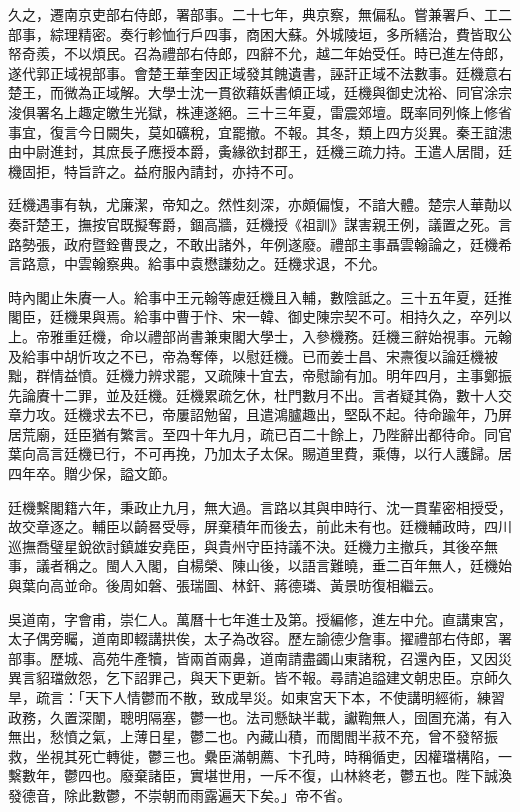 \begin{pinyinscope}
久之，遷南京吏部右侍郎，署部事。二十七年，典京察，無偏私。嘗兼署戶、工二部事，綜理精密。奏行軫恤行戶四事，商困大蘇。外城陵垣，多所繕治，費皆取公帑奇羨，不以煩民。召為禮部右侍郎，四辭不允，越二年始受任。時已進左侍郎，遂代郭正域視部事。會楚王華奎因正域發其餽遺書，誣訐正域不法數事。廷機意右楚王，而微為正域解。大學士沈一貫欲藉妖書傾正域，廷機與御史沈裕、同官涂宗浚俱署名上趣定皦生光獄，株連遂絕。三十三年夏，雷震郊壇。既率同列條上修省事宜，復言今日闕失，莫如礦稅，宜罷撤。不報。其冬，類上四方災異。秦王誼漶由中尉進封，其庶長子應授本爵，夤緣欲封郡王，廷機三疏力持。王遣人居間，廷機固拒，特旨許之。益府服內請封，亦持不可。

廷機遇事有執，尤廉潔，帝知之。然性刻深，亦頗偏愎，不諳大體。楚宗人華勣以奏訐楚王，撫按官既擬奪爵，錮高牆，廷機授《祖訓》謀害親王例，議置之死。言路勢張，政府暨銓曹畏之，不敢出諸外，年例遂廢。禮部主事聶雲翰論之，廷機希言路意，中雲翰察典。給事中袁懋謙劾之。廷機求退，不允。

時內閣止朱賡一人。給事中王元翰等慮廷機且入輔，數陰詆之。三十五年夏，廷推閣臣，廷機果與焉。給事中曹于忭、宋一韓、御史陳宗契不可。相持久之，卒列以上。帝雅重廷機，命以禮部尚書兼東閣大學士，入參機務。廷機三辭始視事。元翰及給事中胡忻攻之不已，帝為奪俸，以慰廷機。已而姜士昌、宋燾復以論廷機被黜，群情益憤。廷機力辨求罷，又疏陳十宜去，帝慰諭有加。明年四月，主事鄭振先論賡十二罪，並及廷機。廷機累疏乞休，杜門數月不出。言者疑其偽，數十人交章力攻。廷機求去不已，帝屢詔勉留，且遣鴻臚趣出，堅臥不起。待命踰年，乃屏居荒廟，廷臣猶有繁言。至四十年九月，疏已百二十餘上，乃陛辭出都待命。同官葉向高言廷機已行，不可再挽，乃加太子太保。賜道里費，乘傳，以行人護歸。居四年卒。贈少保，謚文節。

廷機繫閣籍六年，秉政止九月，無大過。言路以其與申時行、沈一貫輩密相授受，故交章逐之。輔臣以齮晷受辱，屏棄積年而後去，前此未有也。廷機輔政時，四川巡撫喬璧星銳欲討鎮雄安堯臣，與貴州守臣持議不決。廷機力主撤兵，其後卒無事，議者稱之。閩人入閣，自楊榮、陳山後，以語言難曉，垂二百年無人，廷機始與葉向高並命。後周如磐、張瑞圖、林釬、蔣德璘、黃景昉復相繼云。

吳道南，字會甫，崇仁人。萬曆十七年進士及第。授編修，進左中允。直講東宮，太子偶旁矚，道南即輟講拱俟，太子為改容。歷左諭德少詹事。擢禮部右侍郎，署部事。歷城、高苑牛產犢，皆兩首兩鼻，道南請盡蠲山東諸稅，召還內臣，又因災異言貂璫斂怨，乞下詔罪己，與天下更新。皆不報。尋請追謚建文朝忠臣。京師久旱，疏言：「天下人情鬱而不散，致成旱災。如東宮天下本，不使講明經術，練習政務，久置深闈，聰明隔塞，鬱一也。法司懸缺半載，讞鞫無人，囹圄充滿，有入無出，愁憤之氣，上薄日星，鬱二也。內藏山積，而閭閻半菽不充，曾不發帑振救，坐視其死亡轉徙，鬱三也。纍臣滿朝薦、卞孔時，時稱循吏，因權璫構陷，一繫數年，鬱四也。廢棄諸臣，實堪世用，一斥不復，山林終老，鬱五也。陛下誠渙發德音，除此數鬱，不崇朝而雨露遍天下矣。」帝不省。


\end{pinyinscope}
